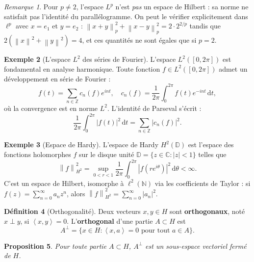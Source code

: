 \documentclass[a4paper,12pt]{book}
\newcommand{\N}{\mathbb{N}}
\newcommand{\Z}{\mathbb{Z}}
\newcommand{\C}{\mathbb{C}}
\newcommand{\dd}{\mathrm{d}}
\newcommand{\norm}[1]{\left\| #1 \right\|}
\newcommand{\abs}[1]{\left| #1 \right|}
\newcommand{\inner}[2]{\left\langle #1, #2 \right\rangle}
\theoremstyle{definition}
\newtheorem{definition}{Définition}[chapter]
\newtheorem{exemple}[definition]{Exemple}
\theoremstyle{plain}
\newtheorem{proposition}[definition]{Proposition}
\theoremstyle{remark}
\newtheorem{remarque}[definition]{Remarque}
\begin{document}
\begin{remarque}\label{rem:lp-pas-hilbert}
Pour $p \neq 2$, l'espace $L^p$ n'est \emph{pas} un espace de Hilbert : sa norme ne satisfait pas l'identité du parallélogramme. On peut le vérifier explicitement dans $\ell^p$ avec $x = e_1$ et $y = e_2$ : $\norm{x+y}_p^2 + \norm{x-y}_p^2 = 2 \cdot 2^{2/p}$ tandis que $2(\norm{x}^2 + \norm{y}^2) = 4$, et ces quantités ne sont égales que si $p = 2$.
\end{remarque}

\begin{exemple}[L'espace $L^2$ des séries de Fourier]\label{ex:L2-fourier}
L'espace $L^2([0,2\pi])$ est fondamental en analyse harmonique. Toute fonction $f \in L^2([0,2\pi])$ admet un développement en série de Fourier :
\[
    f(t) = \sum_{n \in \Z} c_n(f) e^{int}, \quad c_n(f) = \frac{1}{2\pi}\int_0^{2\pi} f(t)e^{-int}\,\dd t,
\]
où la convergence est en norme $L^2$. L'identité de Parseval s'écrit :
\[
    \frac{1}{2\pi}\int_0^{2\pi}\abs{f(t)}^2\,\dd t = \sum_{n \in \Z}\abs{c_n(f)}^2.
\]
\end{exemple}

\begin{exemple}[Espace de Hardy]\label{ex:hardy}
L'espace de Hardy $H^2(\mathbb{D})$ est l'espace des fonctions holomorphes $f$ sur le disque unité $\mathbb{D} = \{z \in \C : \abs{z} < 1\}$ telles que
\[
    \norm{f}_{H^2}^2 = \sup_{0 < r < 1} \frac{1}{2\pi}\int_0^{2\pi}\abs{f(re^{i\theta})}^2\,\dd\theta < \infty.
\]
C'est un espace de Hilbert, isomorphe à $\ell^2(\N)$ via les coefficients de Taylor : si $f(z) = \sum_{n=0}^\infty a_n z^n$, alors $\norm{f}_{H^2}^2 = \sum_{n=0}^\infty \abs{a_n}^2$.
\end{exemple}

\begin{definition}[Orthogonalité]\label{def:orthogonalite}
Deux vecteurs $x, y \in H$ sont \textbf{orthogonaux}, noté $x \perp y$, si $\inner{x}{y} = 0$. L'\textbf{orthogonal} d'une partie $A \subset H$ est
\[
    A^\perp = \{x \in H : \inner{x}{a} = 0 \text{ pour tout } a \in A\}.
\]
\end{definition}

\begin{proposition}\label{prop:orthogonal-ferme}
Pour toute partie $A \subset H$, $A^\perp$ est un sous-espace vectoriel fermé de $H$.
\end{proposition}
\end{document}

